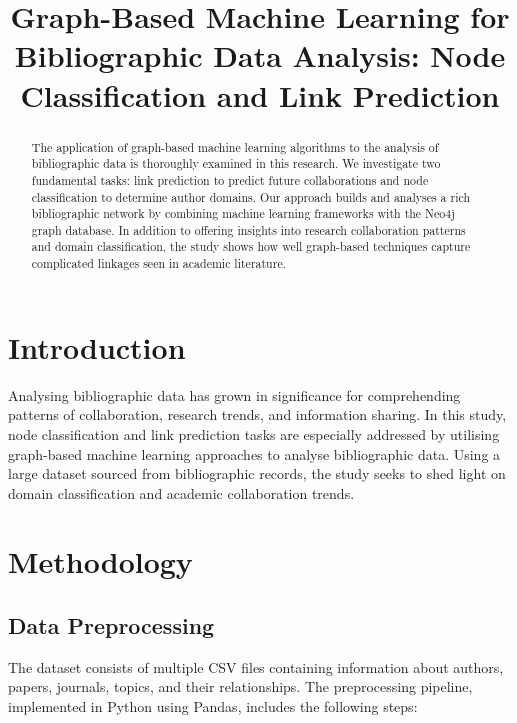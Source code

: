 \documentclass[conference]{IEEEtran}
\begin{document}
\title{Graph-Based Machine Learning for Bibliographic Data Analysis: Node Classification and Link Prediction}

\author{
}

\maketitle

\begin{abstract}
The application of graph-based machine learning algorithms to the analysis of bibliographic data is thoroughly examined in this research.  We investigate two fundamental tasks: link prediction to predict future collaborations and node classification to determine author domains.  Our approach builds and analyses a rich bibliographic network by combining machine learning frameworks with the Neo4j graph database.  In addition to offering insights into research collaboration patterns and domain classification, the study shows how well graph-based techniques capture complicated linkages seen in academic literature.
\end{abstract}

\section{Introduction}
\noindent Analysing bibliographic data has grown in significance for comprehending patterns of collaboration, research trends, and information sharing.  In this study, node classification and link prediction tasks are especially addressed by utilising graph-based machine learning approaches to analyse bibliographic data.  Using a large dataset sourced from bibliographic records, the study seeks to shed light on domain classification and academic collaboration trends.

\section{Methodology}
\subsection{Data Preprocessing}
\noindent The dataset consists of multiple CSV files containing information about authors, papers, journals, topics, and their relationships. The preprocessing pipeline, implemented in Python using Pandas, includes the following steps:
\end{document}

